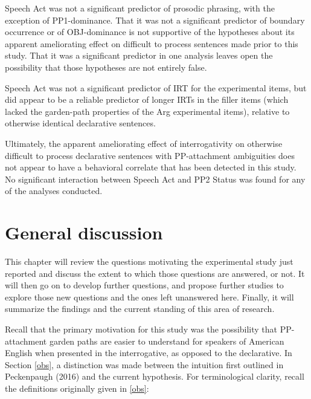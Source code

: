 \documentclass[11pt,oneside]{book}
\begin{document}
Speech Act was not a significant predictor of prosodic phrasing, with the exception of PP1-dominance. That it was not a significant predictor of boundary occurrence or of OBJ-dominance is not supportive of the hypotheses about its apparent ameliorating effect on difficult to process sentences made prior to this study. That it was a significant predictor in one analysis leaves open the possibility that those hypotheses are not entirely false.

Speech Act was not a significant predictor of IRT for the experimental items, but did appear to be a reliable predictor of longer IRTs in the filler items (which lacked the garden-path properties of the Arg experimental items), relative to otherwise identical declarative sentences.

Ultimately, the apparent ameliorating effect of interrogativity on otherwise difficult to process declarative sentences with PP-attachment ambiguities does not appear to have a behavioral correlate that has been detected in this study. No significant interaction between Speech Act and PP2 Status was found for any of the analyses conducted.

\clearpage

\hypertarget{general-discussion}{%
\chapter{General discussion}\label{general-discussion}}

This chapter will review the questions motivating the experimental study just reported and discuss the extent to which those questions are answered, or not. It will then go on to develop further questions, and propose further studies to explore those new questions and the ones left unanswered here. Finally, it will summarize the findings and the current standing of this area of research.

Recall that the primary motivation for this study was the possibility that PP-attachment garden paths are easier to understand for speakers of American English when presented in the interrogative, as opposed to the declarative. In Section \ref{obs}, a distinction was made between the intuition first outlined in Peckenpaugh (2016) and the current hypothesis. For terminological clarity, recall the definitions originally given in \ref{obs}:
\end{document}
